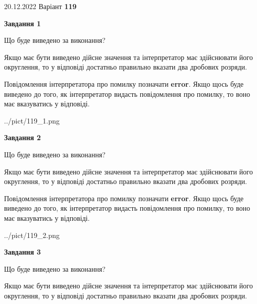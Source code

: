 \documentclass[12pt, ukrainian]{article}
\begin{document}
{20.12.2022 Варіант \No \textbf { 119 }\par}
{
\begin {Large}

{\begin {center}\textbf{Завдання 1}\end {center}}\par
Що буде виведено за виконання? \par

Якщо має бути виведено дійсне значення та інтерпретатор має здійснювати його округлення, 
то у відповіді достатньо правильно вказати два дробових розряди.

Повідомлення інтерпретатора про помилку позначати \textbf{error}.
Якщо щось буде виведено до того, як інтерпретатор видасть повідомлення про помилку, 
то воно має вказуватись у відповіді. \par

\begin{center}
	{../pict/119_1.png}
\end{center}
\newpage

{\begin {center}\textbf{Завдання 2}\end {center}}\par
Що буде виведено за виконання? \par

Якщо має бути виведено дійсне значення та інтерпретатор має здійснювати його округлення, 
то у відповіді достатньо правильно вказати два дробових розряди.

Повідомлення інтерпретатора про помилку позначати \textbf{error}.
Якщо щось буде виведено до того, як інтерпретатор видасть повідомлення про помилку, 
то воно має вказуватись у відповіді. \par

\begin{center}
	{../pict/119_2.png}
\end{center}
\newpage

{\begin {center}\textbf{Завдання 3}\end {center}}\par
Що буде виведено за виконання? \par

Якщо має бути виведено дійсне значення та інтерпретатор має здійснювати його округлення, 
то у відповіді достатньо правильно вказати два дробових розряди.


\end{Large}}
\end{document}
